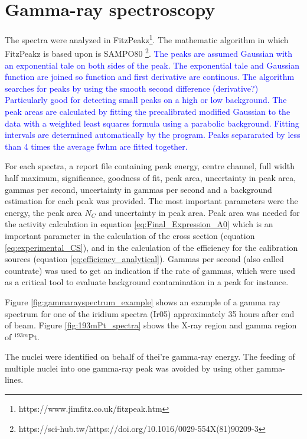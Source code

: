\documentclass[a4paper,11pt,twoside]{book}
\begin{document}
\section{Gamma-ray spectroscopy}
The spectra were analyzed in FitzPeakz\footnote{https://www.jimfitz.co.uk/fitzpeak.htm}. The mathematic algorithm in which FitzPeakz is based upon is SAMPO80 \footnote{https://sci-hub.tw/https://doi.org/10.1016/0029-554X(81)90209-3}. \textcolor{blue}{The peaks are assumed Gaussian with an exponential tale on both sides of the peak. The exponential tale and Gaussian function are joined so function and first derivative are continous. The algorithm searches for peaks by using the smooth second difference (derivative?) Particularly good for detecting small peaks on a high or low background. The peak areas are calculated by fitting the precalibrated modified Gaussian to the data with a weighted least squares formula using a parabolic background. Fitting intervals are determined automatically by the program. Peaks separarated by less than 4 times the average fwhm are fitted together. }

For each spectra,  a report file containing peak energy, centre channel, full width half maximum, significance, goodness of fit, peak area, uncertainty in peak area, gammas per second, uncertainty in gammas per second and a background estimation for each peak was provided. The most important parameters were the energy, the peak area $N_C$ and uncertainty in peak area. Peak area was needed for the activity calculation in equation \ref{eq:Final_Expression_A0} which is an important parameter in the calculation of the cross section (equation \ref{eq:experimental_CS}), and in the calculation of the efficiency for the calibration sources (equation \ref{eq:efficiency_analytical}). Gammas per second (also called countrate) was used to get an indication if the rate of gammas, which were used as a critical tool to evaluate background contamination in a peak for instance. 

Figure \ref{fig:gammarayspectrum_example} shows an example of a gamma ray spectrum for one of the iridium spectra (Ir05) approximately 35 hours after end of beam. Figure \ref{fig:193mPt_spectra} shows the X-ray region and gamma region of $^{193m}$Pt. 

The nuclei were identified on behalf of thei're gamma-ray energy. The feeding of multiple nuclei into one gamma-ray peak was avoided by using other gamma-lines. 
\end{document}
